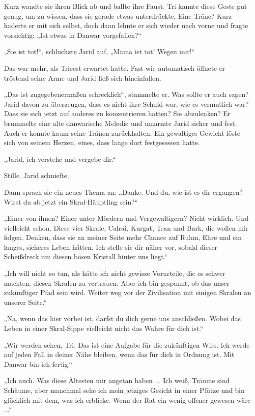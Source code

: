Kurz wandte sie ihren Blick ab und ballte ihre Faust. Tri kannte diese Geste gut genug, um zu wissen, dass sie gerade etwas unterdrückte. Eine Träne? Kurz haderte er mit sich selbst, doch dann lehnte er sich wieder nach vorne und fragte vorsichtig: „Ist etwas in Danwar vorgefallen?“

„Sie ist tot!“, schluchzte Jarid auf, „Mama ist tot! Wegen mir!“

Das war mehr, als Trieest erwartet hatte. Fast wie automatisch öffnete er tröstend seine Arme und Jarid ließ sich hineinfallen.

„Das ist zugegebenermaßen schrecklich“, stammelte er. Was sollte er auch sagen? Jarid davon zu überzeugen, dass es nicht ihre Schuld war, wie es vermutlich war? Dass sie sich jetzt auf anderes zu konzentrieren hatten? Sie abzulenken? Er brummelte eine alte danwarische Melodie und umarmte Jarid sicher und fest. Auch er konnte kaum seine Tränen zurückhalten. Ein gewaltiges Gewicht löste sich von seinem Herzen, eines, dass lange dort festgesessen hatte.

„Jarid, ich verstehe und vergebe dir.“

Stille. Jarid schniefte.

Dann sprach sie ein neues Thema an: „Danke. Und du, wie ist es dir ergangen? Wirst du ab jetzt ein Skral-Häuptling sein?“

„Einer von ihnen? Einer unter Mördern und Vergewaltigern? Nicht wirklich. Und vielleicht schon. Diese vier Skrale, Calrai, Kurgat, Tran und Bark, die wollen mir folgen. Denken, dass sie an meiner Seite mehr Chance auf Ruhm, Ehre und ein langes, sicheres Leben hätten. Ich stelle sie dir näher vor, sobald dieser Scheißdreck um diesen bösen Kristall hinter uns liegt.“

„Ich will nicht so tun, als hätte ich nicht gewisse Vorurteile, die es schwer machten, diesen Skralen zu vertrauen. Aber ich bin gespannt, ob das unser zukünftiger Pfad sein wird. Weiter weg vor der Zivilisation mit einigen Skralen an unserer Seite.“

„Na, wenn das hier vorbei ist, darfst du dich gerne uns anschließen. Wobei das Leben in einer Skral-Sippe vielleicht nicht das Wahre für dich ist.“

„Wir werden sehen, Tri. Das ist eine Aufgabe für die zukünftigen Wirs. Ich werde auf jeden Fall in deiner Nähe bleiben, wenn das für dich in Ordnung ist. Mit Danwar bin ich fertig.“

„Ich auch. Was diese Ältesten mir angetan haben ... Ich weiß, Träume sind Schäume, aber manchmal sehe ich mein jetziges Gesicht in einer Pfütze und bin glücklich mit dem, was ich erblicke. Wenn der Rat ein wenig offener gewesen wäre ...“

